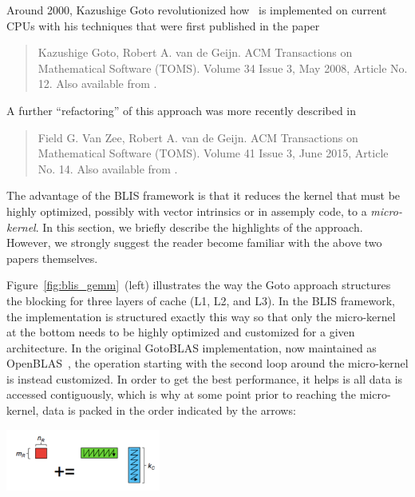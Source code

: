 Around 2000, Kazushige Goto revolutionized how \Gemm\ is implemented on current CPUs with his techniques
that were first published in the paper~\cite{Goto:2008:AHP}
\begin{quote}
	Kazushige Goto, Robert A. van de Geijn.
	ACM Transactions on Mathematical Software (TOMS).
	Volume 34 Issue 3, May 2008, Article No. 12.
	Also available from 
	 .
\end{quote}
A further ``refactoring'' of this approach was more recently described in~\cite{BLIS1} 
\begin{quote}
	Field G. Van Zee, Robert A. van de Geijn. 
	ACM Transactions on Mathematical Software (TOMS).
	Volume 41 Issue 3, June 2015,
	Article No. 14. 
	Also available from .
\end{quote}
The advantage of the BLIS framework is that it reduces the kernel that must be highly optimized, possibly with vector intrinsics or in assemply code, to a {\em micro-kernel}.   In this section, we briefly describe the highlights of the approach.  However, we strongly suggest the reader become familiar with the above two papers themselves.

Figure~\ref{fig:blis_gemm}~(left) illustrates the way the Goto approach structures the blocking for three layers of cache (L1, L2, and L3).  In the BLIS framework, the implementation is structured exactly this way so that only the micro-kernel at the bottom needs to be highly optimized and customized for a given architecture.  In the original GotoBLAS implementation, now maintained as OpenBLAS~\cite{OpenBLASweb}, the operation starting with the second loop around the micro-kernel is instead customized.  In order to get the best performance, it helps is all data is accessed contiguously, which is why at some point prior to reaching the micro-kernel, data is packed in the order indicated by the arrows:
\begin{center}
	\includegraphics[width=2in]{figures/microkernel.pdf}
\end{center}

